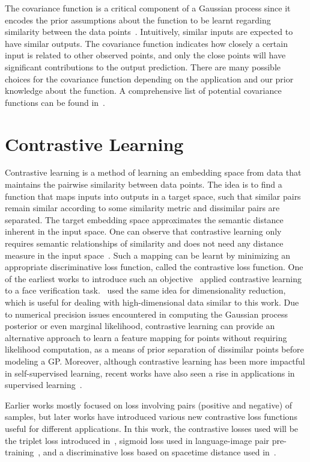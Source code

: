 The covariance function is a critical component of a Gaussian process since it encodes the prior assumptions about the function to be learnt regarding similarity between the data points~\cite{GPML}. Intuitively, similar inputs are expected to have similar outputs. The covariance function indicates how closely a certain input is related to other observed points, and only the close points will have significant contributions to the output prediction. There are many possible choices for the covariance function depending on the application and our prior knowledge about the function. A comprehensive list of potential covariance functions can be found in~\cite{GPML}.


\section{Contrastive Learning}\label{Contrast}
Contrastive learning is a method of learning an embedding space from data that maintains the pairwise similarity between data points. The idea is to find a function that maps inputs into outputs in a target space, such that similar pairs remain similar according to some similarity metric and dissimilar pairs are separated. The target embedding space approximates the semantic distance inherent in the input space. One can observe that contrastive learning only requires semantic relationships of similarity and does not need any distance measure in the input space~\cite{PairMarginCL}. Such a mapping can be learnt by minimizing an appropriate discriminative loss function, called the contrastive loss function. One of the earliest works to introduce such an objective~\cite{ContLoss} applied contrastive learning to a face verification task.~\cite{PairMarginCL} used the same idea for dimensionality reduction, which is useful for dealing with high-dimensional data similar to this work. Due to numerical precision issues encountered in computing the Gaussian process posterior or even marginal likelihood, contrastive learning can provide an alternative approach to learn a feature mapping for points without requiring likelihood computation, as a means of prior separation of dissimilar points before modeling a GP. Moreover, although contrastive learning has been more impactful in self-supervised learning, recent works have also seen a rise in applications in supervised learning~\cite{SelfSupervisedCont, SupervisedCont}. 
\newline

Earlier works mostly focused on loss involving pairs (positive and negative) of samples, but later works have introduced various new contrastive loss functions useful for different applications. In this work, the contrastive losses used will be the triplet loss introduced in~\cite{TripletLoss}, sigmoid loss used in language-image pair pre-training~\cite{SigLIP}, and a discriminative loss based on spacetime distance used in~\cite{SpaceMesh}.
\newline

